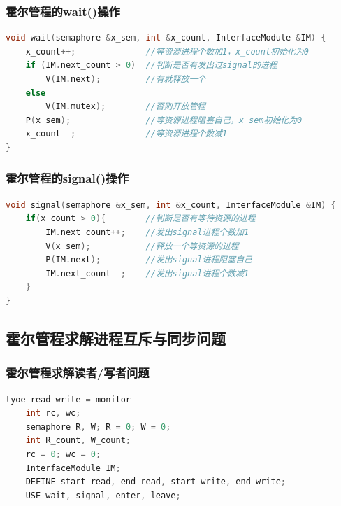 \documentclass[cs4size,a4paper,10pt]{ctexart}
\begin{document}
	\subsubsection{霍尔管程的wait()操作}
	\begin{lstlisting}[language=C, keywordstyle=\color{black}]
void wait(semaphore &x_sem, int &x_count, InterfaceModule &IM) {
	x_count++; 				//等资源进程个数加1，x_count初始化为0
	if (IM.next_count > 0) 	//判断是否有发出过signal的进程
		V(IM.next); 		//有就释放一个 
	else
		V(IM.mutex); 		//否则开放管程
	P(x_sem); 				//等资源进程阻塞自己，x_sem初始化为0 
	x_count--; 				//等资源进程个数减1
}
	\end{lstlisting}

	\subsubsection{霍尔管程的signal()操作}
	\begin{lstlisting}[language=C, keywordstyle=\color{black}]
void signal(semaphore &x_sem, int &x_count, InterfaceModule &IM) {
	if(x_count > 0){ 		//判断是否有等待资源的进程
		IM.next_count++; 	//发出signal进程个数加1 
		V(x_sem); 			//释放一个等资源的进程 
		P(IM.next); 		//发出signal进程阻塞自己 
		IM.next_count--; 	//发出signal进程个数减1
	} 
}
	\end{lstlisting}


	\subsection{霍尔管程求解进程互斥与同步问题}

	\subsubsection{霍尔管程求解读者/写者问题}
	\begin{lstlisting}[language=C, keywordstyle=\color{black}]
tyoe read-write = monitor
	int rc, wc;
	semaphore R, W; R = 0; W = 0; 
	int R_count, W_count;
	rc = 0; wc = 0;
	InterfaceModule IM;
	DEFINE start_read, end_read, start_write, end_write;
	USE wait, signal, enter, leave;
	\end{lstlisting}
\end{document}
